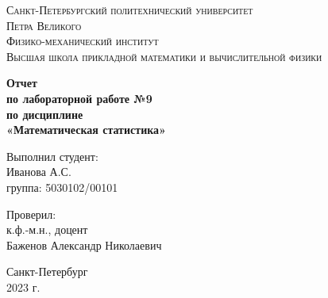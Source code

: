 \begin{titlepage}
	\begin{center}
		\textsc{Санкт-Петербургский политехнический университет\\Петра Великого\\[5mm]
			Физико-механический институт\\[2mm]
			Высшая школа прикладной математики и вычислительной физики}
		
		\vfill
		
		\textbf{Отчет\\по лабораторной работе №9\\по дисциплине\\ «Математическая статистика»
			\\[26mm]
		}
	\end{center}
	
	\begin{flushright}
		Выполнил студент: \\
		Иванова А.С. \\
		группа: 5030102/00101 \\
	\end{flushright}
	
	\begin{flushright}
		Проверил: \\
		к.ф.-м.н., доцент \\
		Баженов Александр Николаевич
	\end{flushright}
	
	\vspace*{\fill}
	\begin{center}
		Санкт-Петербург\\2023 г.
	\end{center}
\end{titlepage}